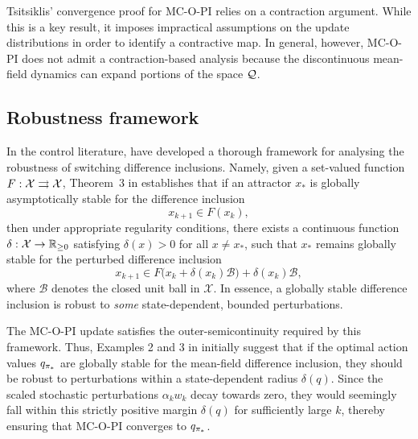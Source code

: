 Tsitsiklis' convergence proof for MC-O-PI relies on a contraction argument. While this is a key result, it imposes impractical assumptions on the update distributions in order to identify a contractive map. In general, however, MC-O-PI does not admit a contraction-based analysis because the discontinuous mean-field dynamics can expand portions of the space $\mathcal{Q}$.




\subsection{Robustness framework}

In the control literature, \citet{Kellett2004SmoothInclusions, Kellett2007SufficientInclusions} have developed a thorough framework for analysing the robustness of switching difference inclusions.
Namely, given a set-valued function $F : \mathcal{X} \rightrightarrows \mathcal{X}$, Theorem~3 in \citep{Kellett2007SufficientInclusions} establishes that
if an attractor $x_*$ is globally asymptotically stable for the difference inclusion
\[
x_{k+1} \in F(x_k) ,
\]
then under appropriate regularity conditions, there exists a continuous function $\delta : \mathcal{X} \to \mathbb{R}_{\ge 0}$ satisfying $\delta(x)>0$ for all $x \neq x_*$, such that $x_*$ remains globally stable for the perturbed difference inclusion
\[
x_{k+1} \in F \bigl(x_k + \delta(x_k)\mathcal B \bigr) + \delta(x_k)\mathcal B ,
\]
where $\mathcal B$ denotes the closed unit ball in $\mathcal X$.
In essence, a globally stable difference inclusion is robust to \textit{some} state-dependent, bounded perturbations.


The MC-O-PI update satisfies the outer-semicontinuity required by this framework.
Thus, Examples 2 and 3 in \citep{Kellett2007SufficientInclusions}
initially suggest that if the optimal action values $q_{{\pi}_*}$ are globally stable for the mean-field difference inclusion, they should be robust to perturbations within a state-dependent radius $\delta(q)$.
Since the scaled stochastic perturbations $\alpha_k w_k$ decay towards zero, they would seemingly fall within this strictly positive margin $\delta(q)$ for sufficiently large $k$, thereby ensuring that MC-O-PI converges to $q_{{\pi}_*}$.


